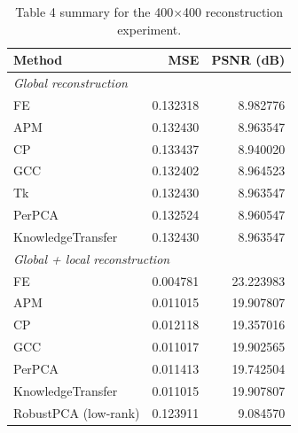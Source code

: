 \documentclass[11pt]{article}
\begin{document}
\begin{table}[htbp]
\centering
\caption{Table 4 summary for the 400$\times$400 reconstruction experiment.}
\label{tab:table4-summary}
\begin{tabular}{lrr}
\toprule
Method & MSE & PSNR (dB) \\
\midrule
\multicolumn{3}{l}{\textit{Global reconstruction}} \\
FE & 0.132318 & 8.982776 \\
APM & 0.132430 & 8.963547 \\
CP & 0.133437 & 8.940020 \\
GCC & 0.132402 & 8.964523 \\
Tk & 0.132430 & 8.963547 \\
PerPCA & 0.132524 & 8.960547 \\
KnowledgeTransfer & 0.132430 & 8.963547 \\
\midrule
\multicolumn{3}{l}{\textit{Global + local reconstruction}} \\
FE & 0.004781 & 23.223983 \\
APM & 0.011015 & 19.907807 \\
CP & 0.012118 & 19.357016 \\
GCC & 0.011017 & 19.902565 \\
PerPCA & 0.011413 & 19.742504 \\
KnowledgeTransfer & 0.011015 & 19.907807 \\
\midrule
RobustPCA (low-rank) & 0.123911 & 9.084570 \\
\bottomrule
\end{tabular}
\end{table}
\end{document}
